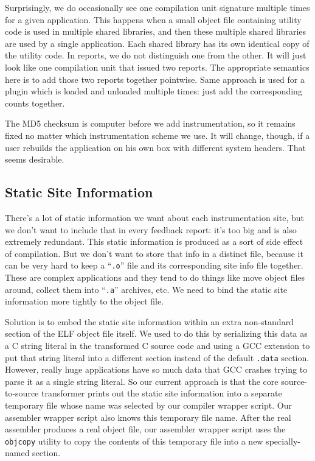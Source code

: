 \documentclass[times,10pt,twocolumn]{article}
\begin{document}
Surprisingly, we do occasionally see one compilation unit signature
multiple times for a given application.  This happens when a small
object file containing utility code is used in multiple shared
libraries, and then these multiple shared libraries are used by a
single application.  Each shared library has its own identical copy of
the utility code.  In reports, we do not distinguish one from the
other.  It will just look like one compilation unit that issued two
reports.  The appropriate semantics here is to add those two reports
together pointwise.  Same approach is used for a plugin which is
loaded and unloaded multiple times: just add the corresponding counts
together.

The MD5 checksum is computer before we add instrumentation, so it
remains fixed no matter which instrumentation scheme we use.  It will
change, though, if a user rebuilds the application on his own box with
different system headers.  That seems desirable.

\subsection{Static Site Information}

There's a lot of static information we want about each instrumentation
site, but we don't want to include that in every feedback report: it's
too big and is also extremely redundant.  This static information is
produced as a sort of side effect of compilation.  But we don't want
to store that info in a distinct file, because it can be very hard to
keep a ``\texttt{.o}'' file and its corresponding site info file
together.  These are complex applications and they tend to do things
like move object files around, collect them into ``\texttt{.a}''
archives, etc.  We need to bind the static site information more
tightly to the object file.

Solution is to embed the static site information within an extra
non-standard section of the ELF object file itself.  We used to do
this by serializing this data as a C string literal in the transformed
C source code and using a GCC extension to put that string literal
into a different section instead of the default \texttt{.data}
section.  However, really huge applications have so much data that GCC
crashes trying to parse it as a single string literal.  So our current
approach is that the core source-to-source transformer prints out the
static site information into a separate temporary file whose name was
selected by our compiler wrapper script.  Our assembler wrapper script
also knows this temporary file name.  After the real assembler
produces a real object file, our assembler wrapper script uses the
\texttt{objcopy} utility to copy the contents of this temporary file
into a new specially-named section.
\end{document}
